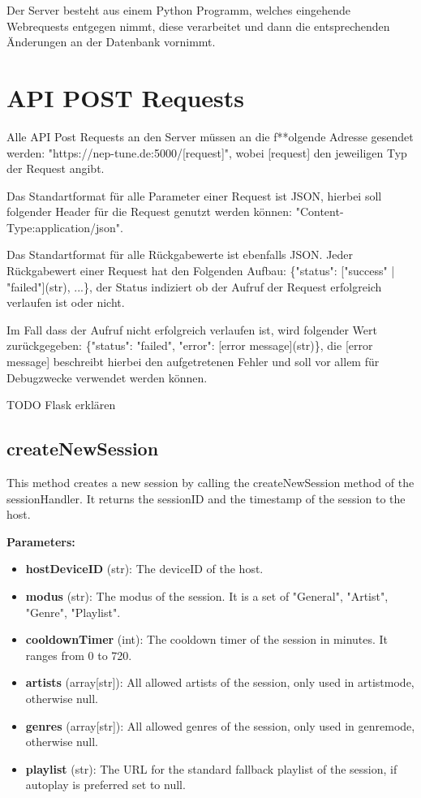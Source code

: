 \documentclass[oneside, nenglish]{sdqtechreport}
\begin{document}
\begin{itemize}
Der Server besteht aus einem Python Programm, welches eingehende Webrequests entgegen nimmt, diese verarbeitet und dann die entsprechenden Änderungen an der Datenbank vornimmt.

\section{API POST Requests}

Alle API Post Requests an den Server müssen an die f**olgende Adresse gesendet werden: "https://nep-tune.de:5000/[request]", wobei [request] den jeweiligen Typ der Request angibt.

Das Standartformat für alle Parameter einer Request ist JSON, hierbei soll folgender Header für die Request genutzt werden können: "Content-Type:application/json".

Das Standartformat für alle Rückgabewerte ist ebenfalls JSON.
Jeder Rückgabewert einer Request hat den Folgenden Aufbau: \{"status": ["success" | "failed"](str), ...\}, der Status indiziert ob der Aufruf der Request erfolgreich verlaufen ist oder nicht.

Im Fall dass der Aufruf nicht erfolgreich verlaufen ist, wird folgender Wert zurückgegeben: \{"status": "failed", "error": [error message](str)\}, die [error message] beschreibt hierbei den aufgetretenen Fehler und soll vor allem für Debugzwecke verwendet werden können.

TODO Flask erklären

\subsection{createNewSession}

This method creates a new session by calling the createNewSession method of the sessionHandler. It returns the sessionID and the timestamp of the session to the host.

\textbf{Parameters:}

\begin{itemize}
    \item \textbf{hostDeviceID} (str): The deviceID of the host.
    \item \textbf{modus} (str): The modus of the session. It is a set of "General", "Artist", "Genre", "Playlist".
    \item \textbf{cooldownTimer} (int): The cooldown timer of the session in minutes. It ranges from 0 to 720.
    \item \textbf{artists} (array[str]): All allowed artists of the session, only used in artistmode, otherwise null.
    \item \textbf{genres} (array[str]): All allowed genres of the session, only used in genremode, otherwise null.
    \item \textbf{playlist} (str): The URL for the standard fallback playlist of the session, if autoplay is preferred set to null.
\end{itemize}


\end{itemize}
\end{document}
